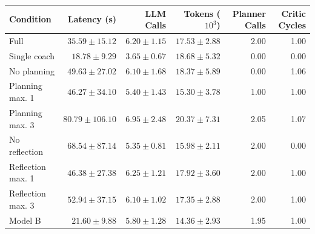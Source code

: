 \begin{tabular}{lrrrrr}
\toprule
Condition & Latency (s) & LLM Calls & Tokens ($10^3$) & Planner Calls & Critic Cycles \\
\midrule
Full & $35.59\pm15.12$ & $6.20\pm1.15$ & $17.53\pm2.88$ & 2.00 & 1.00 \\
Single coach & $18.78\pm9.29$ & $3.65\pm0.67$ & $18.68\pm5.32$ & 0.00 & 0.00 \\
No planning & $49.63\pm27.02$ & $6.10\pm1.68$ & $18.37\pm5.89$ & 0.00 & 1.06 \\
Planning max. 1 & $46.27\pm34.10$ & $5.40\pm1.43$ & $15.30\pm3.78$ & 1.00 & 1.00 \\
Planning max. 3 & $80.79\pm106.10$ & $6.95\pm2.48$ & $20.37\pm7.31$ & 2.05 & 1.07 \\
No reflection & $68.54\pm87.14$ & $5.35\pm0.81$ & $15.98\pm2.11$ & 2.00 & 0.00 \\
Reflection max. 1 & $46.38\pm27.38$ & $6.25\pm1.21$ & $17.92\pm3.60$ & 2.00 & 1.00 \\
Reflection max. 3 & $52.94\pm37.15$ & $6.10\pm1.02$ & $17.35\pm2.88$ & 2.00 & 1.00 \\
Model B & $21.60\pm9.88$ & $5.80\pm1.28$ & $14.36\pm2.93$ & 1.95 & 1.00 \\
\bottomrule
\end{tabular}
